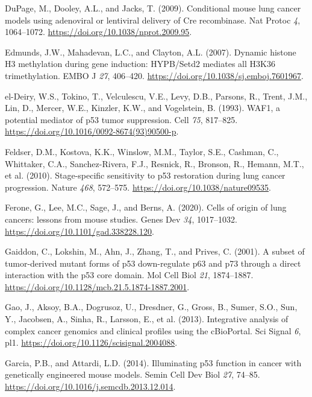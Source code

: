 \begin{CSLReferences}{0}{0}
\leavevmode{}%
DuPage, M., Dooley, A.L., and Jacks, T. (2009). Conditional mouse lung cancer models using adenoviral or lentiviral delivery of Cre recombinase. Nat Protoc \emph{4}, 1064--1072. \url{https://doi.org/10.1038/nprot.2009.95}.

\leavevmode{}%
Edmunds, J.W., Mahadevan, L.C., and Clayton, A.L. (2007). Dynamic histone H3 methylation during gene induction: HYPB/Setd2 mediates all H3K36 trimethylation. EMBO J \emph{27}, 406--420. \url{https://doi.org/10.1038/sj.emboj.7601967}.

\leavevmode{}%
el-Deiry, W.S., Tokino, T., Velculescu, V.E., Levy, D.B., Parsons, R., Trent, J.M., Lin, D., Mercer, W.E., Kinzler, K.W., and Vogelstein, B. (1993). WAF1, a potential mediator of p53 tumor suppression. Cell \emph{75}, 817--825. \url{https://doi.org/10.1016/0092-8674(93)90500-p}.

\leavevmode{}%
Feldser, D.M., Kostova, K.K., Winslow, M.M., Taylor, S.E., Cashman, C., Whittaker, C.A., Sanchez-Rivera, F.J., Resnick, R., Bronson, R., Hemann, M.T., et al. (2010). Stage-specific sensitivity to p53 restoration during lung cancer progression. Nature \emph{468}, 572--575. \url{https://doi.org/10.1038/nature09535}.

\leavevmode{}%
Ferone, G., Lee, M.C., Sage, J., and Berns, A. (2020). Cells of origin of lung cancers: lessons from mouse studies. Genes Dev \emph{34}, 1017--1032. \url{https://doi.org/10.1101/gad.338228.120}.

\leavevmode{}%
Gaiddon, C., Lokshin, M., Ahn, J., Zhang, T., and Prives, C. (2001). A subset of tumor-derived mutant forms of p53 down-regulate p63 and p73 through a direct interaction with the p53 core domain. Mol Cell Biol \emph{21}, 1874--1887. \url{https://doi.org/10.1128/mcb.21.5.1874-1887.2001}.

\leavevmode{}%
Gao, J., Aksoy, B.A., Dogrusoz, U., Dresdner, G., Gross, B., Sumer, S.O., Sun, Y., Jacobsen, A., Sinha, R., Larsson, E., et al. (2013). Integrative analysis of complex cancer genomics and clinical profiles using the cBioPortal. Sci Signal \emph{6}, pl1. \url{https://doi.org/10.1126/scisignal.2004088}.

\leavevmode{}%
Garcia, P.B., and Attardi, L.D. (2014). Illuminating p53 function in cancer with genetically engineered mouse models. Semin Cell Dev Biol \emph{27}, 74--85. \url{https://doi.org/10.1016/j.semcdb.2013.12.014}.


\end{CSLReferences}
